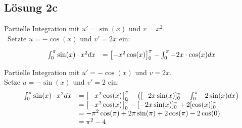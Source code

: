 \documentclass[main.tex]{subfiles}
\begin{document}
\subsection{Lösung 2c}
Partielle Integration mit $u'=\sin( x)$ und $v=x^{2}$.\\\
Setzte $u=-\cos( x)$ und $v'=2x$ ein:

\begin{equation*}
    \begin{array}{ c c }
    \int _{0}^{\pi }\sin( x) \cdotp x^{2} dx & =\left[ -x^{2}\cos( x)\right]_{0}^{\pi } -\int _{0}^{\pi } -2x\cdot \cos( x) dx
    \end{array}
\end{equation*}

Partielle Integration mit $u'=-\cos( x)$ und $v=2x$.\\
Setze $u=-\sin( x)$ und $v'=2$ ein:
\begin{equation*}
    \begin{array}{ c l }
    \int _{0}^{\pi }\sin( x) \cdotp x^{2} dx & =\left[ -x^{2}\cos( x)\right]_{0}^{\pi } -\left([ -2x\sin( x)]_{0}^{\pi } -\int _{0}^{\pi } -2\sin( x) dx\right)\\
    & =\left[ -x^{2}\cos( x)\right]_{0}^{\pi } -[ -2x\sin( x)]_{0}^{\pi } +2[\cos( x)]_{0}^{\pi }\\
    & =-\pi ^{2}\cos( \pi ) +2\pi \sin( \pi ) +2\cos( \pi ) -2\cos( 0)\\
    & =\pi ^{2} -4
    \end{array}
\end{equation*}
\end{document}
